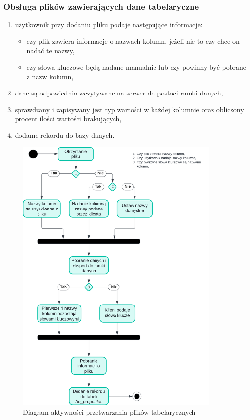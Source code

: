 \documentclass[12pt,a4paper,twoside]{article}
\begin{document}
\subsubsection*{Obsługa plików zawierających dane tabelaryczne}
\begin{enumerate}
	\item użytkownik przy dodaniu pliku podaje następujące informacje:
	\begin{itemize}
		\item czy plik zawiera informacje o nazwach kolumn, jeżeli nie to czy chce on nadać te nazwy,
		\item czy słowa kluczowe będą nadane manualnie lub czy powinny być pobrane z nazw kolumn,
	\end{itemize}
	\item dane są odpowiednio wczytywane na serwer do postaci ramki danych,
	\item sprawdzany i zapisywany jest typ wartości w każdej kolumnie oraz obliczony procent ilości wartości brakujących,
	\item dodanie rekordu do bazy danych.
\end{enumerate}
\begin{figure}[h!]
\centering
  \includegraphics[width=0.9\textwidth]{img/csvac.pdf}
  \caption{Diagram aktywności przetwarzania plików tabelarycznych}
\end{figure}
\clearpage
\newpage
\end{document}
